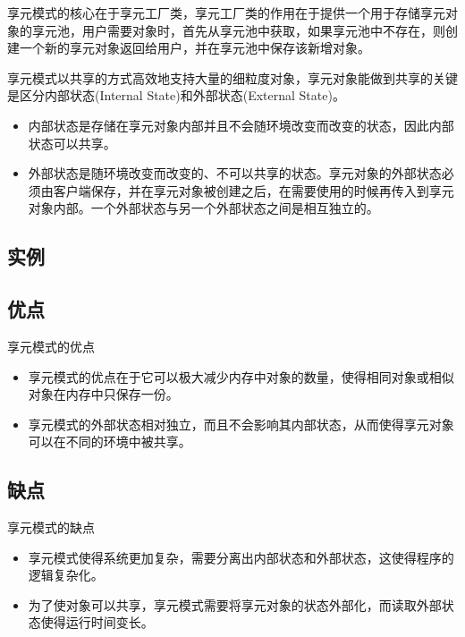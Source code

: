 \documentclass[letterpaper,10pt,english]{sphinxmanual}
\begin{document}
\sphinxAtStartPar
享元模式的核心在于享元工厂类，享元工厂类的作用在于提供一个用于存储享元对象的享元池，用户需要对象时，首先从享元池中获取，如果享元池中不存在，则创建一个新的享元对象返回给用户，并在享元池中保存该新增对象。

\sphinxAtStartPar
享元模式以共享的方式高效地支持大量的细粒度对象，享元对象能做到共享的关键是区分内部状态(Internal State)和外部状态(External State)。
\begin{itemize}
\item {} 
\sphinxAtStartPar
内部状态是存储在享元对象内部并且不会随环境改变而改变的状态，因此内部状态可以共享。

\item {} 
\sphinxAtStartPar
外部状态是随环境改变而改变的、不可以共享的状态。享元对象的外部状态必须由客户端保存，并在享元对象被创建之后，在需要使用的时候再传入到享元对象内部。一个外部状态与另一个外部状态之间是相互独立的。

\end{itemize}


\subsection{实例}
\label{\detokenize{structural_patterns/flyweight:id9}}

\subsection{优点}
\label{\detokenize{structural_patterns/flyweight:id10}}
\sphinxAtStartPar
享元模式的优点
\begin{itemize}
\item {} 
\sphinxAtStartPar
享元模式的优点在于它可以极大减少内存中对象的数量，使得相同对象或相似对象在内存中只保存一份。

\item {} 
\sphinxAtStartPar
享元模式的外部状态相对独立，而且不会影响其内部状态，从而使得享元对象可以在不同的环境中被共享。

\end{itemize}


\subsection{缺点}
\label{\detokenize{structural_patterns/flyweight:id11}}
\sphinxAtStartPar
享元模式的缺点
\begin{itemize}
\item {} 
\sphinxAtStartPar
享元模式使得系统更加复杂，需要分离出内部状态和外部状态，这使得程序的逻辑复杂化。

\item {} 
\sphinxAtStartPar
为了使对象可以共享，享元模式需要将享元对象的状态外部化，而读取外部状态使得运行时间变长。

\end{itemize}
\end{document}
